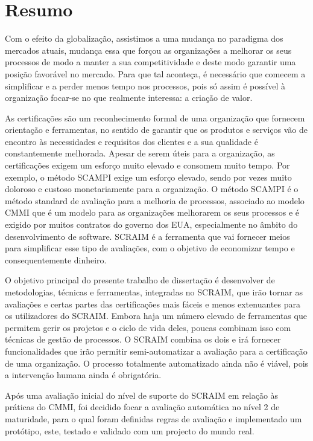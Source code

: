 \chapter*{Resumo}
Com o efeito da globalização, assistimos a uma mudança no paradigma dos mercados atuais, mudança essa que forçou as organizações a melhorar os seus processos de modo a manter a sua competitividade e deste modo garantir uma posição favorável no mercado. Para que tal aconteça, é necessário que comecem a simplificar e a perder menos tempo nos processos, pois só assim é possível à organização focar-se no que realmente interessa: a criação de valor.

As certificações são um reconhecimento formal de uma organização que fornecem orientação e ferramentas, no sentido de garantir que os produtos e serviços vão de encontro às necessidades e requisitos dos clientes e a sua qualidade é constantemente melhorada. Apesar de serem úteis para a organização, as certificações exigem um esforço muito elevado e consomem muito tempo. Por exemplo, o método SCAMPI exige um esforço elevado, sendo por vezes muito doloroso e custoso monetariamente para a organização.
O método SCAMPI é o método standard de avaliação para a melhoria de processos, associado ao modelo CMMI que é um modelo para as organizações melhorarem os seus processos e é exigido por muitos contratos do governo dos EUA, especialmente no âmbito do desenvolvimento de software. SCRAIM é a ferramenta que vai fornecer meios para simplificar esse tipo de avaliações, com o objetivo de economizar tempo e consequentemente dinheiro.

O objetivo principal do presente trabalho de dissertação é desenvolver de metodologias, técnicas e ferramentas, integradas no SCRAIM, que irão tornar as avaliações e certas partes das certificações mais fáceis e menos extenuantes para os utilizadores do SCRAIM.
Embora haja um número elevado de ferramentas que permitem gerir os projetos e o ciclo de vida deles, poucas combinam isso com técnicas de gestão de processos. O SCRAIM combina os dois e irá fornecer funcionalidades que irão permitir semi-automatizar a avaliação para a certificação de uma organização. O processo totalmente automatizado ainda não é viável, pois a intervenção humana ainda é obrigatória.

Após uma avaliação inicial do nível de suporte do SCRAIM em relação às práticas do CMMI, foi decidido focar a avaliação automática no nível 2 de maturidade, para o qual foram definidas regras de avaliação e implementado um protótipo, este, testado e validado com um projecto do mundo real.

